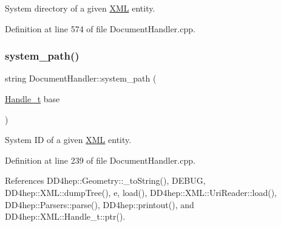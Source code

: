 System directory of a given \hyperlink{namespace_d_d4hep_1_1_x_m_l}{X\+ML} entity. 

Definition at line 574 of file Document\+Handler.\+cpp.

\hypertarget{class_d_d4hep_1_1_x_m_l_1_1_document_handler_a606d6b73c50047ecdb1df4c69be320f6}{}\label{class_d_d4hep_1_1_x_m_l_1_1_document_handler_a606d6b73c50047ecdb1df4c69be320f6} 
\subsubsection{\texorpdfstring{system\+\_\+path()}{system\_path()}\hspace{0.1cm}{\footnotesize\ttfamily [1/3]}}
{\footnotesize\ttfamily string Document\+Handler\+::system\+\_\+path (\begin{DoxyParamCaption}\item[{\hyperlink{class_d_d4hep_1_1_x_m_l_1_1_handle__t}{Handle\+\_\+t}}]{base }\end{DoxyParamCaption})\hspace{0.3cm}{\ttfamily [static]}}



System ID of a given \hyperlink{namespace_d_d4hep_1_1_x_m_l}{X\+ML} entity. 



Definition at line 239 of file Document\+Handler.\+cpp.



References D\+D4hep\+::\+Geometry\+::\+\_\+to\+String(), D\+E\+B\+UG, D\+D4hep\+::\+X\+M\+L\+::dump\+Tree(), e, load(), D\+D4hep\+::\+X\+M\+L\+::\+Uri\+Reader\+::load(), D\+D4hep\+::\+Parsers\+::parse(), D\+D4hep\+::printout(), and D\+D4hep\+::\+X\+M\+L\+::\+Handle\+\_\+t\+::ptr().

\hypertarget{class_d_d4hep_1_1_x_m_l_1_1_document_handler_a6cc1864ffc55f0a9168f5238ea5c06fd}{}\label{class_d_d4hep_1_1_x_m_l_1_1_document_handler_a6cc1864ffc55f0a9168f5238ea5c06fd} 
